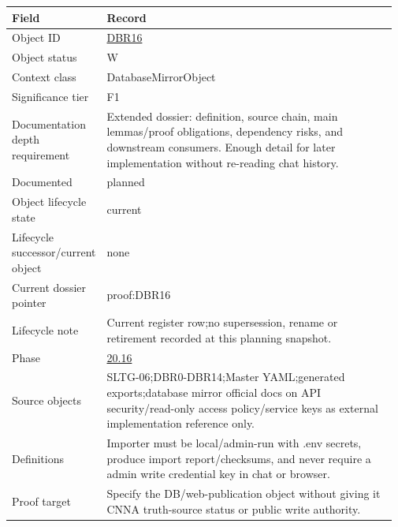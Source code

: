 \begin{longtable}{L{0.16\linewidth} L{0.81\linewidth}}
\hline
\textbf{Field} & \textbf{Record}\\
\hline
Object ID & \hyperlink{object-row-DBR16}{DBR16}\\
\hline\addlinespace[0.20em]
Object status & W\\
\hline\addlinespace[0.20em]
Context class & DatabaseMirrorObject\\
\hline\addlinespace[0.20em]
Significance tier & F1\\
\hline\addlinespace[0.20em]
Documentation depth requirement & Extended dossier: definition, source chain, main lemmas/\allowbreak{}proof obligations, dependency risks, and downstream consumers. Enough detail for later implementation without re-reading chat history.\\
\hline\addlinespace[0.20em]
Documented & planned\\
\hline\addlinespace[0.20em]
Object lifecycle state & current\\
\hline\addlinespace[0.20em]
Lifecycle successor/\allowbreak{}current object & none\\
\hline\addlinespace[0.20em]
Current dossier pointer & proof:DBR16\\
\hline\addlinespace[0.20em]
Lifecycle note & Current register row;\newline no supersession, rename or retirement recorded at this planning snapshot.\\
\hline\addlinespace[0.20em]
Phase & \hyperlink{phase-row-20-16}{20.16}\\
\hline\addlinespace[0.20em]
Source objects & SLTG-06;\newline DBR0-DBR14;\newline Master YAML;\newline generated exports;\newline database mirror official docs on API security/\allowbreak{}read-only access policy/\allowbreak{}service keys as external implementation reference only.\\
\hline\addlinespace[0.20em]
Definitions & Importer must be local/\allowbreak{}admin-run with .env secrets, produce import report/\allowbreak{}checksums, and never require a admin write credential key in chat or browser.\\
\hline\addlinespace[0.20em]
Proof target & Specify the DB/\allowbreak{}web-publication object without giving it CNNA truth-source status or public write authority.\\

\end{longtable}
